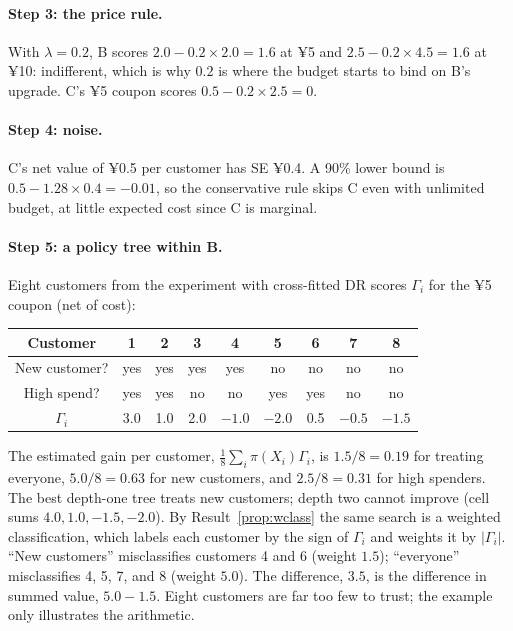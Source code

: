 \documentclass[11pt]{article}
\begin{document}
\paragraph{Step 3: the price rule.} With $\lambda = 0.2$, B scores $2.0 - 0.2 \times 2.0 = 1.6$ at ¥5 and $2.5 - 0.2 \times 4.5 = 1.6$ at ¥10:
indifferent, which is why $0.2$ is where the budget starts to bind on B's upgrade. C's ¥5 coupon scores
$0.5 - 0.2 \times 2.5 = 0$.

\paragraph{Step 4: noise.} C's net value of ¥0.5 per customer has SE ¥0.4. A 90\% lower bound is $0.5 - 1.28 \times 0.4 = -0.01$, so
the conservative rule skips C even with unlimited budget, at little expected cost since C is marginal.

\paragraph{Step 5: a policy tree within B.} Eight customers from the experiment with cross-fitted DR scores $\Gamma_i$ for the ¥5
coupon (net of cost):
\begin{center}
\begin{tabular}{ccccccccc}
\toprule
Customer & 1 & 2 & 3 & 4 & 5 & 6 & 7 & 8 \\
\midrule
New customer? & yes & yes & yes & yes & no & no & no & no \\
High spend? & yes & yes & no & no & yes & yes & no & no \\
$\Gamma_i$ & 3.0 & 1.0 & 2.0 & $-1.0$ & $-2.0$ & 0.5 & $-0.5$ & $-1.5$ \\
\bottomrule
\end{tabular}
\end{center}
The estimated gain per customer, $\tfrac18\sum_i\pi(X_i)\Gamma_i$, is $1.5/8 = 0.19$ for treating everyone, $5.0/8 = 0.63$
for new customers, and $2.5/8 = 0.31$ for high spenders. The best depth-one tree treats new customers; depth two cannot improve (cell sums $4.0, 1.0, -1.5,
-2.0$). By Result~\ref{prop:wclass} the same search is a weighted classification, which labels each customer by the sign
of $\Gamma_i$ and weights it by $|\Gamma_i|$. ``New customers'' misclassifies customers 4 and 6 (weight $1.5$); ``everyone''
misclassifies 4, 5, 7, and 8 (weight $5.0$). The difference, $3.5$, is the difference in summed value, $5.0 - 1.5$. Eight
customers are far too few to trust; the example only illustrates the arithmetic.
\end{document}
